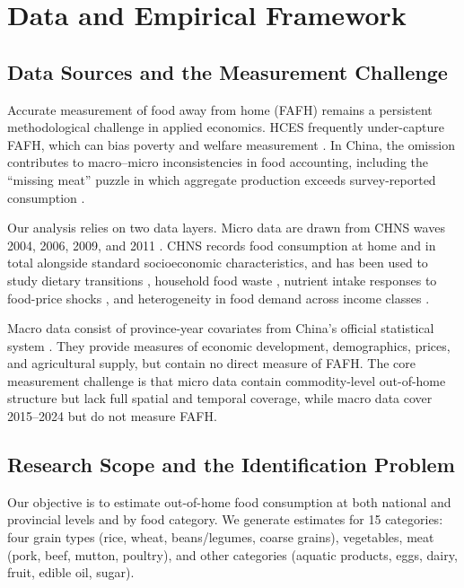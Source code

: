 \documentclass[12pt,a4paper]{article}
\begin{document}
\section{Data and Empirical Framework}
\label{sec:data-framework}

\subsection{Data Sources and the Measurement Challenge}
\label{subsec:data-sources}

Accurate measurement of food away from home (FAFH) remains a persistent methodological challenge in applied economics. HCES frequently under-capture FAFH, which can bias poverty and welfare measurement \citep{Zezza2017}. In China, the omission contributes to macro--micro inconsistencies in food accounting, including the ``missing meat'' puzzle in which aggregate production exceeds survey-reported consumption \citep{YuAbler2014, Xiao2015}.

Our analysis relies on two data layers. Micro data are drawn from CHNS waves 2004, 2006, 2009, and 2011 \citep{CHNS_Design,Popkin2010CHNS}. CHNS records food consumption at home and in total alongside standard socioeconomic characteristics, and has been used to study dietary transitions \citep{HuangTian2019}, household food waste \citep{MinWangYu2021}, nutrient intake responses to food-price shocks \citep{LiBaiZhu2023}, and heterogeneity in food demand across income classes \citep{Ren2018}.

Macro data consist of province-year covariates from China’s official statistical system \citep{NBS_China}. They provide measures of economic development, demographics, prices, and agricultural supply, but contain no direct measure of FAFH. The core measurement challenge is that micro data contain commodity-level out-of-home structure but lack full spatial and temporal coverage, while macro data cover 2015--2024 but do not measure FAFH.

\subsection{Research Scope and the Identification Problem}
\label{subsec:scope-id}

Our objective is to estimate out-of-home food consumption at both national and provincial levels and by food category. We generate estimates for 15 categories: four grain types (rice, wheat, beans/legumes, coarse grains), vegetables, meat (pork, beef, mutton, poultry), and other categories (aquatic products, eggs, dairy, fruit, edible oil, sugar).
\end{document}
